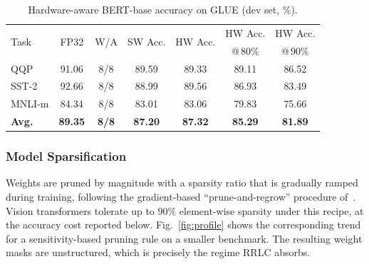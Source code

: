 \documentclass[lettersize,journal]{IEEEtran}
\begin{document}
\begin{table}[!t]
    \caption{Hardware-aware BERT-base accuracy on GLUE (dev set, \%).}
    \label{tab:bert}
    \centering
    \footnotesize
    \setlength{\tabcolsep}{3pt}
    \begin{tabular*}{\columnwidth}{@{}l@{\extracolsep{\fill}}cccccc@{}}
        \toprule
        \multirow{2}{*}{Task} & \multirow{2}{*}{FP32} & \multirow{2}{*}{W/A}
            & \multirow{2}{*}{SW Acc.} & \multirow{2}{*}{HW Acc.}
            & HW Acc. & HW Acc. \\
            & & & & & @\,$80\%$ & @\,$90\%$ \\
        \midrule
        QQP         & 91.06 & 8/8 & 89.59 & 89.33 & 89.11 & 86.52 \\
        SST-2       & 92.66 & 8/8 & 88.99 & 89.56 & 86.93 & 83.49 \\
        MNLI-m      & 84.34 & 8/8 & 83.01 & 83.06 & 79.83 & 75.66 \\
        \midrule
        \textbf{Avg.} & \textbf{89.35} & \textbf{8/8} & \textbf{87.20} & \textbf{87.32} & \textbf{85.29} & \textbf{81.89} \\
        \bottomrule
    \end{tabular*}
    \vspace{-6pt}
\end{table}

\subsubsection{Model Sparsification}
\label{sec:algo-prune}

Weights are pruned by magnitude with a sparsity ratio that is gradually ramped during training, following the gradient-based ``prune-and-regrow'' procedure of~\cite{liu2021sparse,CAP2023nips}. Vision transformers tolerate up to $90\%$ element-wise sparsity under this recipe, at the accuracy cost reported below. Fig.~\ref{fig:profile} shows the corresponding trend for a sensitivity-based pruning rule on a smaller benchmark. The resulting weight masks are unstructured, which is precisely the regime RRLC absorbs.
\end{document}

